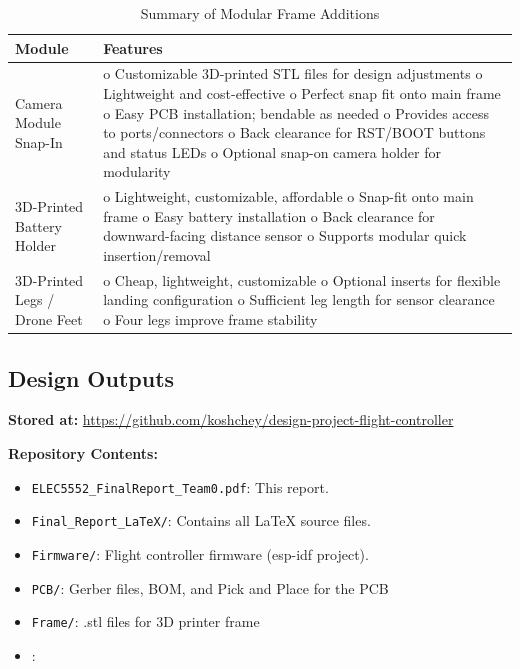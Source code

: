 \begin{table}[H]
\centering
\begin{tabular}{|p{3cm}|p{11cm}|}
\hline
\textbf{Module} & \textbf{Features} \\
\hline
Camera Module Snap-In &
o Customizable 3D-printed STL files for design adjustments \newline
o Lightweight and cost-effective \newline
o Perfect snap fit onto main frame \newline
o Easy PCB installation; bendable as needed \newline
o Provides access to ports/connectors \newline
o Back clearance for RST/BOOT buttons and status LEDs \newline
o Optional snap-on camera holder for modularity \\
\hline
3D-Printed Battery Holder & 
o Lightweight, customizable, affordable \newline
o Snap-fit onto main frame \newline
o Easy battery installation \newline
o Back clearance for downward-facing distance sensor \newline
o Supports modular quick insertion/removal \\
\hline
3D-Printed Legs / Drone Feet & 
o Cheap, lightweight, customizable \newline
o Optional inserts for flexible landing configuration \newline
o Sufficient leg length for sensor clearance \newline
o Four legs improve frame stability \\
\hline
\end{tabular}
\caption{Summary of Modular Frame Additions}
\label{tab:frame-add-summary}
\end{table}

\pagebreak
\subsection{Design Outputs}

\textbf{Stored at:} \url{https://github.com/koshchey/design-project-flight-controller}

\textbf{Repository Contents:}
\begin{itemize}
    \item \texttt{ELEC5552\_FinalReport\_Team0.pdf}: This report.
    \item \texttt{Final\_Report\_LaTeX/}: Contains all \LaTeX{} source files.
    \item \texttt{Firmware/}: Flight controller firmware (\gls{esp-idf} project).
    \item \texttt{PCB/}: Gerber files, BOM, and Pick and Place for the PCB
    \item \texttt{Frame/}: .stl files for 3D printer frame
    \item {}:
\end{itemize}

